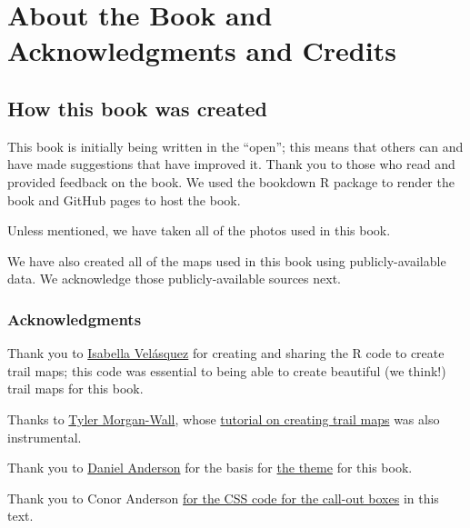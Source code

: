 \documentclass[
]{book}
\begin{document}
\hypertarget{about-the-book-and-acknowledgments-and-credits}{%
\chapter*{About the Book and Acknowledgments and Credits}\label{about-the-book-and-acknowledgments-and-credits}}

\hypertarget{how-this-book-was-created}{%
\section*{How this book was created}\label{how-this-book-was-created}}

This book is initially being written in the ``open''; this means that others can and have made suggestions that have improved it. Thank you to those who read and provided feedback on the book. We used the bookdown R package to render the book and GitHub pages to host the book.

Unless mentioned, we have taken all of the photos used in this book.

We have also created all of the maps used in this book using publicly-available data. We acknowledge those publicly-available sources next.

\hypertarget{acknowledgments}{%
\subsection*{Acknowledgments}\label{acknowledgments}}

Thank you to \href{https://ivelasq.rbind.io/}{Isabella Velásquez} for creating and sharing the R code to create trail maps; this code was essential to being able to create beautiful (we think!) trail maps for this book.

Thanks to \href{https://www.tylermw.com/}{Tyler Morgan-Wall}, whose \href{https://www.tylermw.com/adding-open-street-map-data-to-rayshader-maps-in-r/}{tutorial on creating trail maps} was also instrumental.

Thank you to \href{https://github.com/datalorax}{Daniel Anderson} for the basis for \href{https://github.com/datalorax/sds-r/blob/main/style.css}{the theme} for this book.

Thank you to Conor Anderson \href{https://gitlab.com/claut/man_ccia}{for the CSS code for the call-out boxes} in this text.
\end{document}
